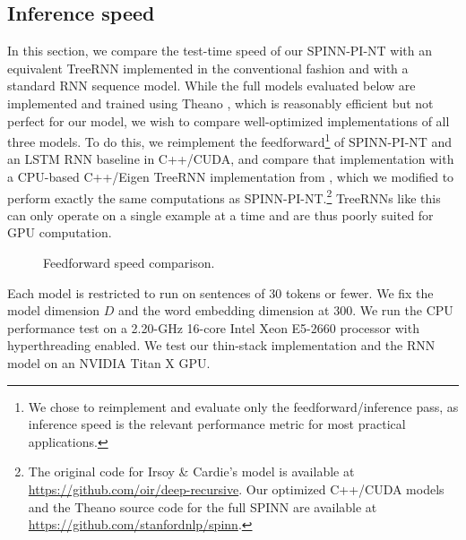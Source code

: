 \documentclass[11pt]{article}
\begin{document}
\subsection{Inference speed}
\label{sec:speed}

In this section, we compare the test-time speed of our SPINN-PI-NT with an equivalent TreeRNN implemented in the conventional fashion and with a standard RNN sequence model. While the full models evaluated below are implemented and trained using Theano \citep{theano}, which is reasonably efficient but not perfect for our model, we wish to compare well-optimized implementations of all three models. To do this, we reimplement the feedforward\footnote{We chose to reimplement and evaluate only the feedforward/inference pass, as inference speed is the relevant performance metric for most practical applications.} of SPINN-PI-NT and an LSTM RNN baseline in C++/CUDA, and compare that implementation with a CPU-based C++/Eigen TreeRNN implementation from \citet{irsoy2014deep}, which we modified to perform exactly the same computations as SPINN-PI-NT.\footnote{The original code for Irsoy \& Cardie's model is available at \url{https://github.com/oir/deep-recursive}. Our optimized C++/CUDA models and the Theano source code for the full SPINN are available at \url{https://github.com/stanfordnlp/spinn}.} TreeRNNs like this can only operate on a single example at a time and are thus poorly suited for GPU computation.

\begin{figure}
\centering
{}
\caption{Feedforward speed comparison.}
\label{fig:speed}
\end{figure}


Each model is restricted to run on sentences of 30 tokens or fewer. We fix the model dimension $D$ and the word embedding dimension at 300. We run the CPU performance test on a 2.20-GHz 16-core Intel Xeon E5-2660 processor with hyperthreading enabled. We test our thin-stack implementation and the RNN model on an NVIDIA Titan X GPU.
\end{document}
